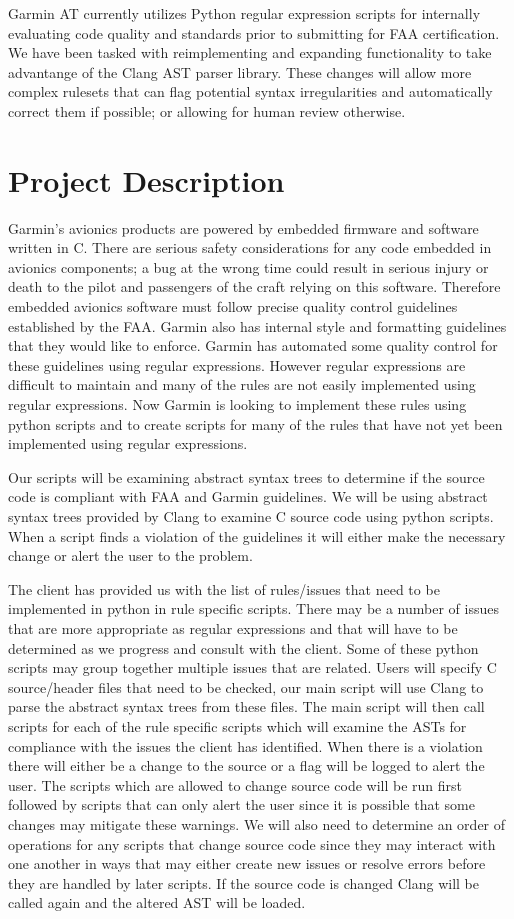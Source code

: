 \documentclass[11pt]{scrreprt}
\begin{document}
Garmin AT currently utilizes Python regular expression scripts for internally evaluating code quality and standards prior to submitting for FAA certification. We have been tasked with reimplementing and expanding functionality to take advantange of the Clang AST parser library. These changes will allow more complex rulesets that can flag potential syntax irregularities and automatically correct them if possible; or allowing for human review otherwise.

\section{Project Description}
Garmin’s avionics products are powered by embedded firmware and software written in C. There are serious safety considerations for any code embedded in avionics components; a bug at the wrong time could result in serious injury or death to the pilot and passengers of the craft relying on this software. Therefore embedded avionics software must follow precise quality control guidelines established by the FAA. Garmin also has internal style and formatting guidelines that they would like to enforce. Garmin has automated some quality control for these guidelines using regular expressions. However regular expressions are difficult to maintain and many of the rules are not easily implemented using regular expressions. Now Garmin is looking to implement these rules using python scripts and to create scripts for many of the rules that have not yet been implemented using regular expressions.

Our scripts will be examining abstract syntax trees to determine if the source code is compliant with FAA and Garmin guidelines. We will be using abstract syntax trees provided by Clang to examine C source code using python scripts. When a script finds a violation of the guidelines it will either make the necessary change or alert the user to the problem.

The client has provided us with the list of rules/issues that need to be implemented in python in rule specific scripts. There may be a number of issues that are more appropriate as regular expressions and that will have to be determined as we progress and consult with the client. Some of these python scripts may group together multiple issues that are related. Users will specify C source/header files that need to be checked, our main script will use Clang to parse the abstract syntax trees from these files. The main script will then call scripts for each of the rule specific scripts which will examine the ASTs for compliance with the issues the client has identified. When there is a violation there will either be a change to the source or a flag will be logged to alert the user. The scripts which are allowed to change source code will be run first followed by scripts that can only alert the user since it is possible that some changes may mitigate these warnings. We will also need to determine an order of operations for any scripts that change source code since they may interact with one another in ways that may either create new issues or resolve errors before they are handled by later scripts. If the source code is changed Clang will be called again and the altered AST will be loaded.
\end{document}
